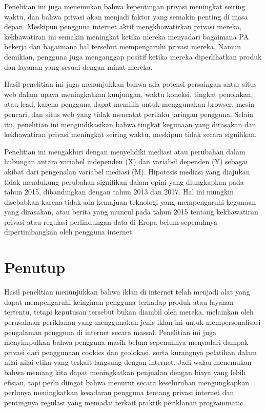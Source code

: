 \documentclass{article}
\begin{document}
Penelitian ini juga menemukan bahwa kepentingan privasi meningkat seiring waktu, dan bahwa privasi akan menjadi faktor yang semakin penting di masa depan. Meskipun pengguna internet aktif mengkhawatirkan privasi mereka, kekhawatiran ini semakin meningkat ketika mereka menyadari bagaimana PA bekerja dan bagaimana hal tersebut mempengaruhi privasi mereka. Namun demikian, pengguna juga menganggap positif ketika mereka diperlihatkan produk dan layanan yang sesuai dengan minat mereka.

Hasil penelitian ini juga menunjukkan bahwa ada potensi persaingan antar situs web dalam upaya meningkatkan kunjungan, waktu koneksi, tingkat penolakan, atau lead, karena pengguna dapat memilih untuk menggunakan browser, mesin pencari, dan situs web yang tidak mencatat perilaku jaringan pengguna. Selain itu, penelitian ini mengindikasikan bahwa tingkat kegunaan yang dirasakan dan kekhawatiran privasi meningkat seiring waktu, meskipun tidak secara signifikan.

Penelitian ini mengakhiri dengan menyelidiki mediasi atau perubahan dalam hubungan antara variabel independen (X) dan variabel dependen (Y) sebagai akibat dari pengenalan variabel mediasi (M). Hipotesis mediasi yang diajukan tidak mendukung perubahan signifikan dalam opini yang diungkapkan pada tahun 2015, dibandingkan dengan tahun 2013 dan 2017. Hal ini mungkin disebabkan karena tidak ada kemajuan teknologi yang mempengaruhi kegunaan yang dirasakan, atau berita yang muncul pada tahun 2015 tentang kekhawatiran privasi atau regulasi perlindungan data di Eropa belum sepenuhnya dipertimbangkan oleh pengguna internet.
\section*{Penutup}

Hasil penelitian \cite{PALO1961} menunjukkan bahwa iklan di internet telah menjadi alat yang dapat mempengaruhi keinginan pengguna terhadap produk atau layanan tertentu, tetapi keputusan tersebut bukan diambil oleh mereka, melainkan oleh perusahaan periklanan yang menggunakan jenis iklan ini untuk mempersonalisasi pengalaman pengguna di internet secara massal. Penelitian ini juga menyimpulkan bahwa pengguna masih belum sepenuhnya menyadari dampak privasi dari penggunaan cookies dan geolokasi, serta kurangnya pelatihan dalam nilai-nilai etika yang terkait langsung dengan internet. Jadi walau \cite{mahmud2023analisis} menemukan bahwa memang kita dapat meningkatkan penjualan dengan biaya yang lebih efisian, tapi perlu diingat bahwa menurut \cite{PALO1961}
secara keseluruhan mengungkapkan perlunya meningkatkan kesadaran pengguna tentang privasi internet dan pentingnya regulasi yang memadai terkait praktik periklanan programmatic.






\end{document}
